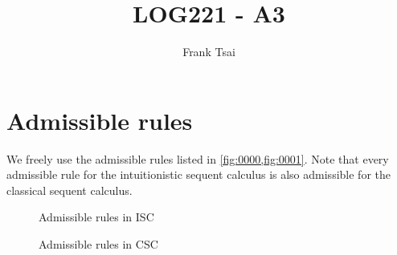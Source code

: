 \documentclass[a4paper]{article}
\title{LOG221 - A3}
\author{Frank Tsai}
\begin{document}
\maketitle

\section*{Admissible rules}

We freely use the admissible rules listed in \cref{fig:0000,fig:0001}.
Note that every admissible rule for the intuitionistic sequent calculus is also admissible for the classical sequent calculus.

\begin{figure}[h]
  \centering
  \caption{Admissible rules in ISC}
  \label{fig:0000}
\end{figure}
\begin{figure}[h]
  \centering
  \caption{Admissible rules in CSC}
  \label{fig:0001}
\end{figure}
\end{document}
